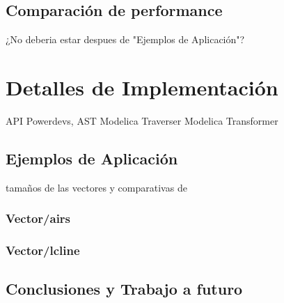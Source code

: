 \documentclass[a4paper,	11pt]{report}
\begin{document}
\section{Comparación de performance}
¿No deberia estar despues de "Ejemplos de Aplicación"?

\chapter{Detalles de Implementación}
API Powerdevs, AST Modelica
Traverser
Modelica Transformer


\section{Ejemplos de Aplicación}
tamaños de las vectores y comparativas de 
\subsection{Vector/airs}
\subsection{Vector/lcline}
\nocite{*}
\section{Conclusiones y Trabajo a futuro}




\end{document}
